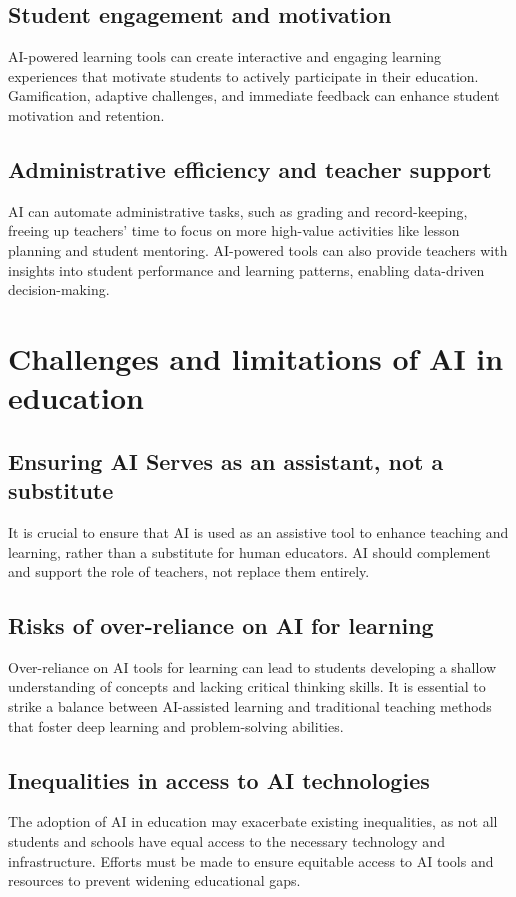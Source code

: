 \documentclass{article}
\begin{document}
\subsection{Student engagement and motivation}
AI-powered learning tools can create interactive and engaging learning experiences that motivate students to actively participate in their education. Gamification, adaptive challenges, and immediate feedback can enhance student motivation and retention.

\subsection{Administrative efficiency and teacher support}
AI can automate administrative tasks, such as grading and record-keeping, freeing up teachers' time to focus on more high-value activities like lesson planning and student mentoring. AI-powered tools can also provide teachers with insights into student performance and learning patterns, enabling data-driven decision-making.

\section{Challenges and limitations of AI in education}

\subsection{Ensuring AI Serves as an assistant, not a substitute}
It is crucial to ensure that AI is used as an assistive tool to enhance teaching and learning, rather than a substitute for human educators. AI should complement and support the role of teachers, not replace them entirely.

\subsection{Risks of over-reliance on AI for learning}
Over-reliance on AI tools for learning can lead to students developing a shallow understanding of concepts and lacking critical thinking skills. It is essential to strike a balance between AI-assisted learning and traditional teaching methods that foster deep learning and problem-solving abilities.

\subsection{Inequalities in access to AI technologies}
The adoption of AI in education may exacerbate existing inequalities, as not all students and schools have equal access to the necessary technology and infrastructure. Efforts must be made to ensure equitable access to AI tools and resources to prevent widening educational gaps.
\end{document}
